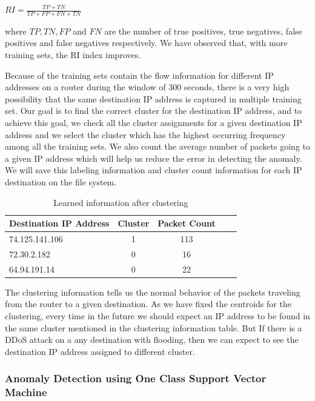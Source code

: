 \documentclass[12pt,oneside,a4paper]{article}
\begin{document}
\hspace{4cm} $RI={\frac {TP+TN}{TP+FP+FN+TN}}$

where $TP, TN, FP$ and $FN$ are the number of true positives, true negatives, false positives and false negatives respectively. We have observed that, with more training sets, the RI index improves.

Because of the training sets contain the flow information for different IP addresses on a router during the window of 300 seconds, there is a very high possibility that the same destination IP address is captured in multiple training set. Our goal is to find the correct cluster for the destination IP address, and to achieve this goal, we check all the cluster assignments for a given destination IP address and we select the cluster which has the highest occurring frequency among all the training sets. We also count the average number of packets going to a given IP address which will help us reduce the error in detecting the anomaly. We will save this labeling information and cluster count information for each IP destination on the file system.

\begin{table}[H]
\centering
  \begin{tabular}{| l | c | c | c | c |}
    \hline
    {Destination IP Address}  &Cluster  &Packet Count \\
    \hline
    74.125.141.106  & 1     & 113  \\ \hline
    72.30.2.182     & 0     & 16   \\ \hline
    64.94.191.14    & 0     & 22   \\ \hline
  \end{tabular}
\caption{Learned information after clustering} \label{table:learned-clustering}
\end{table}

The clustering information tells us the normal behavior of the packets traveling from the router to a given destination. As we have fixed the centroids for the clustering, every time in the future we should expect an IP address to be found in the same cluster mentioned in the clustering information table. But If there is a DDoS attack on a any destination with flooding, then we can expect to see the destination IP address assigned to different cluster.

\subsubsection{Anomaly Detection using One Class Support Vector Machine}
\end{document}
